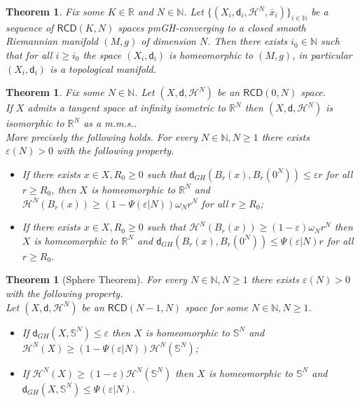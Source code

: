 \documentclass[a4paper]{amsart}
\theoremstyle{plain}
\newtheorem{theorem}[lemma]{Theorem}
\theoremstyle{definition}
\numberwithin{equation}{section}
\newcommand{\R}{\mathbb{R}}
\newcommand{\bS}{\mathbb{S}}
\newcommand{\N}{\mathbb{N}}
\newcommand{\RCD}{\mathsf{RCD}}
\newcommand{\sfd}{\mathsf d}
\newcommand{\cH}{\mathcal{H}}
\begin{document}
\begin{theorem}\label{thm:ConvergenceMan}
Fix some $K\in \R$ and $N\in \N$. Let $\{(X_{i},\sfd_{i}, \cH^{N}, \bar{x}_{i})\}_{i\in \N}$ be a sequence of $\RCD(K,N)$ spaces pmGH-converging to a {closed} smooth Riemannian manifold $(M,g)$ { of dimension $N$}.
Then there exists $i_{0}\in \N$ such that for all $i\geq i_{0}$ the space $(X_{i},\sfd_{i})$ is  homeomorphic to $(M,g)$, in particular $(X_{i},\sfd_{i})$ is a topological manifold.

\end{theorem}



\begin{theorem}\label{Thm:ConeInf}
Fix some  $N\in \N$. Let $(X,\sfd, \cH^{N})$ be an  $\RCD(0,N)$ space.
\\If $X$ admits a tangent space at infinity isometric  to $\R^{N}$ then $(X,\sfd, \cH^{N})$ is isomorphic to $\R^{N}$ as a m.m.s.. 
\\More precisely the following holds.  For every $N\in \N, N\geq 1$ there exists $\varepsilon(N)>0$ with the following property. 
\begin{itemize}
\item If there exists $x\in X, R_{0}\geq 0$ such that $\sfd_{GH}(B_{r}(x),B_{r}(0^{N}))\leq \varepsilon r$ for all $r\geq R_{0}$,  then $X$ is homeomorphic to $\R^{N}$ and $\cH^{N}(B_{r}(x))\geq (1-\Psi(\varepsilon|N))  \omega_{N} r^{N}$ for all $r\geq R_{0}$;
\item If there exists $x\in X, R_{0}\geq 0$ such that $\cH^{N}(B_{r}(x))\geq (1-\varepsilon)  \omega_{N} r^{N}$ then $X$ is homeomorphic to $\R^{N}$ and $\sfd_{GH}(B_{r}(x),B_{r}(0^{N}))\leq \Psi(\varepsilon|N)  r$ for all $r\geq R_{0}$.
\end{itemize}
\end{theorem}

\begin{theorem}[Sphere Theorem]\label{thm:sphere}
For every $N\in \N, N\geq 1$ there exists $\varepsilon(N)>0$ with the following property. 
\\Let $(X,\sfd, \cH^{N})$ be an $\RCD(N-1,N)$ space for some  $N\in \N, N\geq 1$.
\begin{itemize}
\item If $\sfd_{GH}(X,\bS^{N})\leq \varepsilon$ then $X$ is homeomorphic to $\bS^{N}$ and $\cH^{N}(X)\geq (1-\Psi(\varepsilon|N))  \cH^{N}(\bS^{N})$;
\item If $\cH^{N}(X)\geq (1-\varepsilon) \cH^{N}(\bS^{N})$ then  $X$ is homeomorphic to $\bS^{N}$ and $\sfd_{GH}(X,\bS^{N})\leq \Psi(\varepsilon|N)$.
\end{itemize}
\end{theorem}
\end{document}
